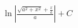 \documentclass[preview]{standalone}
\begin{document}
\begin{align*}
\ln|\frac{\sqrt{a^2+x^2}+\frac{x}{a}}{a}|+C
\end{align*}
\end{document}
